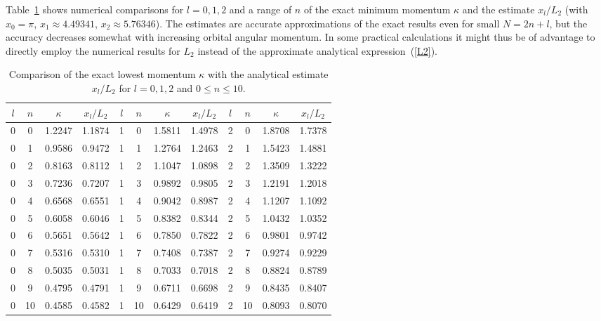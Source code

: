	Table~\ref{tab:lowest_kappa} shows numerical comparisons for $l=0,1,2$
	and a range of $n$ of the exact minimum momentum $\kappa$ and the
	estimate $x_l/L_2$ (with $x_0=\pi$, $x_1\approx 4.49341$, $x_2\approx
	5.76346$).  The estimates are accurate approximations of the exact
	results even for small $N=2n+l$, but the accuracy decreases somewhat
	with increasing orbital angular momentum. In some practical
	calculations it might thus be of advantage to directly employ the
	numerical results for $L_2$ instead of the approximate analytical
	expression~(\ref{L2}).

	\begin{table}[h]
	\begin{tabular}{c|c|c|c||c|c|c|c||c|c|c|c}
	$l$& $n$ & $\kappa$  &${x_l/ L_2}$ &
	$l$& $n$ & $\kappa$  &${x_l/ L_2}$ &
	$l$& $n$ & $\kappa$  &${x_l/ L_2}$ \\
	\hline
	0 &  0  & 1.2247  & 1.1874   &
	1 &  0  & 1.5811  & 1.4978   &
	2 &  0  & 1.8708  & 1.7378   \\
	0 &  1  & 0.9586  & 0.9472   &
	1 &  1  & 1.2764  & 1.2463   &
	2 &  1  & 1.5423  & 1.4881   \\
	0 &  2  & 0.8163  & 0.8112   &
	1 &  2  & 1.1047  & 1.0898   &
	2 &  2  & 1.3509  & 1.3222   \\
	0  &  3  &  0.7236  &  0.7207  &
	1  &  3  &  0.9892  &  0.9805  &
	2 &    3  &    1.2191  &     1.2018    \\
	0   &  4   &   0.6568   &    0.6551    &
	1 &    4 &     0.9042   &    0.8987  &
	2 &    4  &    1.1207  &     1.1092   \\
	0  &   5   &   0.6058   &    0.6046    &
	1 &    5 &     0.8382   &    0.8344  &
	2 &    5   &   1.0432   &    1.0352    \\
	0  &   6   &   0.5651   &    0.5642    &
	1 &    6 &     0.7850   &    0.7822  &
	2  &   6  &    0.9801  &     0.9742  \\
	0   &  7 &     0.5316    &   0.5310    &
	1  &   7 &     0.7408   &    0.7387  &
	2 &    7  &    0.9274  &     0.9229   \\
	0  &   8    &  0.5035    &   0.5031    &
	1  &   8 &     0.7033   &    0.7018  &
	2 &    8  &    0.8824  &     0.8789   \\
	0  &  9  &    0.4795   &    0.4791     &
	1 &    9 &     0.6711   &    0.6698  &
	2  &   9   &   0.8435  &     0.8407    \\
	0  &   10 &   0.4585  &     0.4582    &
	1 &    10 &   0.6429  &     0.6419   &
	2  &   10   & 0.8093 &      0.8070  \\
	\end{tabular}
	\caption{Comparison of the exact lowest momentum $\kappa$ with the analytical
		estimate $x_l/L_2$ for $l=0, 1, 2$ and $0 \leq n \leq 10$.}
	\label{tab:lowest_kappa}
	\end{table}

